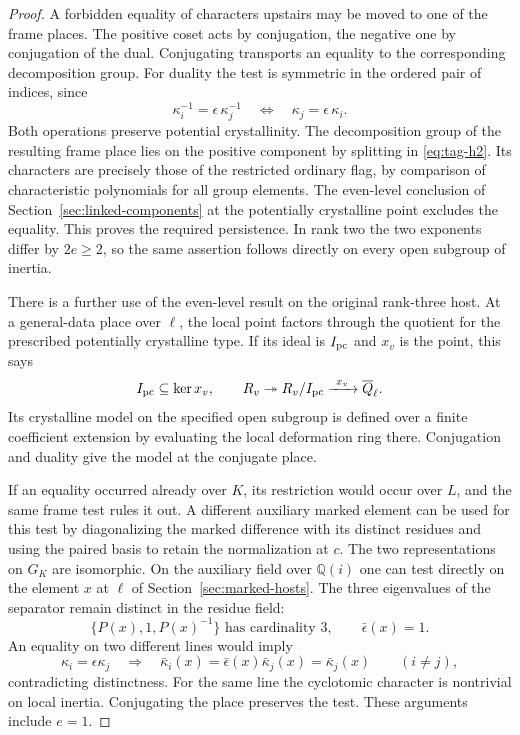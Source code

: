 \begin{proof}
A forbidden equality of characters upstairs may be moved
to one of the frame places. The positive coset acts by
conjugation, the negative one by conjugation of the dual.
Conjugating transports an equality to the corresponding decomposition group. For duality the test is symmetric in the ordered pair of indices, since
\[
 \kappa_i^{-1}=\epsilon\,\kappa_j^{-1}
      \quad\Longleftrightarrow\quad
 \kappa_j=\epsilon\,\kappa_i .
\]
Both operations preserve potential crystallinity. The decomposition group of the resulting
frame place lies on the positive component by splitting in
\eqref{eq:tag-h2}. Its characters are precisely those of the restricted
ordinary flag, by comparison of characteristic polynomials
for all group elements. The even-level conclusion of
Section~\ref{sec:linked-components} at the potentially
crystalline point excludes the equality. This proves the
required persistence. In rank two the two exponents differ
by \(2e\ge2\), so the same assertion follows directly on
every open subgroup of inertia.

There is a further use of the even-level result on the
original rank-three host. At a general-data place over \(\ell\), the local point factors through the quotient for the prescribed potentially crystalline type. If its ideal is \(I_{\rm pc}\) and \(x_v\) is the point, this says
\[
 I_{\rm pc}\subseteq\ker x_v,\qquad R_v\twoheadrightarrow R_v/I_{\rm pc}\xrightarrow{\ x_v\ }\overline{\mathbb Q}_\ell .
\] Its crystalline model on
the specified open subgroup is defined over a finite
coefficient extension by evaluating the local deformation
ring there. Conjugation and duality give the model at the
conjugate place.

If an equality occurred already over
\(K\), its restriction would occur over \(L\), and the
same frame test rules it out. A different auxiliary marked
element can be used for this test by diagonalizing the marked
difference with its distinct residues and using the paired
basis to retain the normalization at \(c\). The two
representations on \(G_K\) are isomorphic. On the
auxiliary field over \(\mathbb Q(i)\) one can test directly on the element \(x\)
at \(\ell\) of Section~\ref{sec:marked-hosts}. The three eigenvalues of the separator remain distinct in the residue field:
\[
 \{P(x),1,P(x)^{-1}\}\text{ has cardinality }3,\qquad \bar\epsilon(x)=1 .
\] An equality on two different lines would imply
\[
  \kappa_i=\epsilon\kappa_j
     \quad\Longrightarrow\quad
  \bar\kappa_i(x)=\bar\epsilon(x)\bar\kappa_j(x)=\bar\kappa_j(x)
       \qquad (i\ne j),
\]
contradicting distinctness.
For the same line the cyclotomic character is nontrivial
on local inertia. Conjugating the place preserves the test.
These arguments include \(e=1\).


\end{proof}
